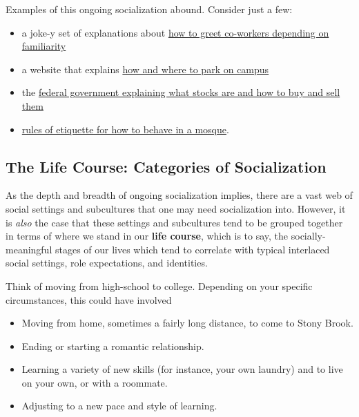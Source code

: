 \documentclass[
  letterpaper,
  DIV=11,
  numbers=noendperiod,
  oneside]{scrartcl}
\providecommand{\tightlist}{%
  \setlength{\itemsep}{0pt}\setlength{\parskip}{0pt}}
\begin{document}
Examples of this ongoing socialization abound. Consider just a few:

\begin{itemize}
\tightlist
\item
  a joke-y set of explanations about
  \href{https://www.youtube.com/watch?v=aQLOmKkEKYM}{how to greet
  co-workers depending on familiarity}
\item
  a website that explains
  \href{https://www.stonybrook.edu/mobility-and-parking/parking/students.html}{how
  and where to park on campus}
\item
  the
  \href{https://www.investor.gov/introduction-investing/investing-basics/investment-products/stocks}{federal
  government explaining what stocks are and how to buy and sell them}
\item
  \href{https://www.reddit.com/r/islam/comments/14z0u77/whats_the_etiquette_for_being_in_a_mosque/}{rules
  of etiquette for how to behave in a mosque}.
\end{itemize}

\subsection{The Life Course: Categories of
Socialization}\label{the-life-course-categories-of-socialization}

As the depth and breadth of ongoing socialization implies, there are a
vast web of social settings and subcultures that one may need
socialization into. However, it is \emph{also} the case that these
settings and subcultures tend to be grouped together in terms of where
we stand in our \textbf{life course}, which is to say, the
socially-meaningful stages of our lives which tend to correlate with
typical interlaced social settings, role expectations, and identities.

Think of moving from high-school to college. Depending on your specific
circumstances, this could have involved

\begin{itemize}
\tightlist
\item
  Moving from home, sometimes a fairly long distance, to come to Stony
  Brook.
\item
  Ending or starting a romantic relationship.
\item
  Learning a variety of new skills (for instance, your own laundry) and
  to live on your own, or with a roommate.
\item
  Adjusting to a new pace and style of learning.
\end{itemize}
\end{document}
